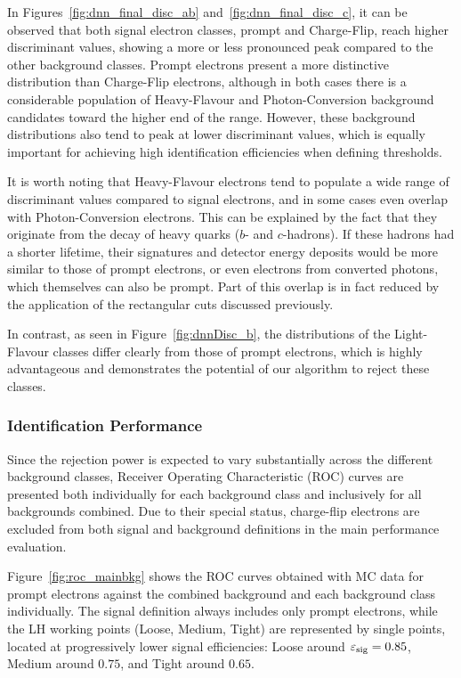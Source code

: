 In Figures~\ref{fig:dnn_final_disc_ab} and~\ref{fig:dnn_final_disc_c}, it can be observed that both signal electron classes, prompt and Charge-Flip, reach higher discriminant values, showing a more or less pronounced peak compared to the other background classes. Prompt electrons present a more distinctive distribution than Charge-Flip electrons, although in both cases there is a considerable population of Heavy-Flavour and Photon-Conversion background candidates toward the higher end of the range. However, these background distributions also tend to peak at lower discriminant values, which is equally important for achieving high identification efficiencies when defining thresholds.

It is worth noting that Heavy-Flavour electrons tend to populate a wide range of discriminant values compared to signal electrons, and in some cases even overlap with Photon-Conversion electrons. This can be explained by the fact that they originate from the decay of heavy quarks ($b$- and $c$-hadrons). If these hadrons had a shorter lifetime, their signatures and detector energy deposits would be more similar to those of prompt electrons, or even electrons from converted photons, which themselves can also be prompt. Part of this overlap is in fact reduced by the application of the rectangular cuts discussed previously.

In contrast, as seen in Figure~\ref{fig:dnnDisc_b}, the distributions of the Light-Flavour classes differ clearly from those of prompt electrons, which is highly advantageous and demonstrates the potential of our algorithm to reject these classes.

\subsubsection{Identification Performance}

Since the rejection power is expected to vary substantially across the different background classes, Receiver Operating Characteristic (ROC) curves are presented both individually for each background class and inclusively for all backgrounds combined. Due to their special status, charge-flip electrons are excluded from both signal and background definitions in the main performance evaluation.

Figure~\ref{fig:roc_mainbkg} shows the ROC curves obtained with MC data for prompt electrons against the combined background and each background class individually. The signal definition always includes only prompt electrons, while the LH working points (Loose, Medium, Tight) are represented by single points, located at progressively lower signal efficiencies: Loose around $\varepsilon_{\rm sig} = 0.85$, Medium around $0.75$, and Tight around $0.65$.

